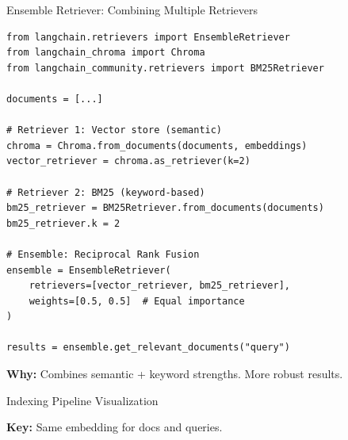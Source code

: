 \documentclass[aspectratio=169,11pt]{beamer}
\begin{document}
\begin{frame}[fragile]{Ensemble Retriever: Combining Multiple Retrievers}
  \begin{lstlisting}
from langchain.retrievers import EnsembleRetriever
from langchain_chroma import Chroma
from langchain_community.retrievers import BM25Retriever

documents = [...]

# Retriever 1: Vector store (semantic)
chroma = Chroma.from_documents(documents, embeddings)
vector_retriever = chroma.as_retriever(k=2)

# Retriever 2: BM25 (keyword-based)
bm25_retriever = BM25Retriever.from_documents(documents)
bm25_retriever.k = 2

# Ensemble: Reciprocal Rank Fusion
ensemble = EnsembleRetriever(
    retrievers=[vector_retriever, bm25_retriever],
    weights=[0.5, 0.5]  # Equal importance
)

results = ensemble.get_relevant_documents("query")
  \end{lstlisting}

  \vspace{0.07cm}
  \textbf{Why:} Combines semantic + keyword strengths. More robust results.
\end{frame}

\begin{frame}{Indexing Pipeline Visualization}

  \textbf{Key:} Same embedding for docs and queries.
\end{frame}
\end{document}
